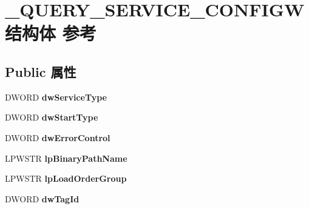 \hypertarget{struct___q_u_e_r_y___s_e_r_v_i_c_e___c_o_n_f_i_g_w}{}\section{\+\_\+\+Q\+U\+E\+R\+Y\+\_\+\+S\+E\+R\+V\+I\+C\+E\+\_\+\+C\+O\+N\+F\+I\+G\+W结构体 参考}
\label{struct___q_u_e_r_y___s_e_r_v_i_c_e___c_o_n_f_i_g_w}
\subsection*{Public 属性}
\begin{DoxyCompactItemize}
\item 
\mbox{\label{struct___q_u_e_r_y___s_e_r_v_i_c_e___c_o_n_f_i_g_w_aba726da6a95cd58130d304f642ab639e}} 
D\+W\+O\+RD {\bfseries dw\+Service\+Type}
\item 
\mbox{\label{struct___q_u_e_r_y___s_e_r_v_i_c_e___c_o_n_f_i_g_w_a27a985ab85babb808aef76313a398639}} 
D\+W\+O\+RD {\bfseries dw\+Start\+Type}
\item 
\mbox{\label{struct___q_u_e_r_y___s_e_r_v_i_c_e___c_o_n_f_i_g_w_ae67cb722fb49ee1a3caa0a62fdc8b52b}} 
D\+W\+O\+RD {\bfseries dw\+Error\+Control}
\item 
\mbox{\label{struct___q_u_e_r_y___s_e_r_v_i_c_e___c_o_n_f_i_g_w_aa92cd001a9661696ef20b2bc1463d271}} 
L\+P\+W\+S\+TR {\bfseries lp\+Binary\+Path\+Name}
\item 
\mbox{\label{struct___q_u_e_r_y___s_e_r_v_i_c_e___c_o_n_f_i_g_w_ac5014023f41a62b7e5c89a6c3f42227d}} 
L\+P\+W\+S\+TR {\bfseries lp\+Load\+Order\+Group}
\item 
\mbox{\label{struct___q_u_e_r_y___s_e_r_v_i_c_e___c_o_n_f_i_g_w_a3aa5bd9f8715b46b29a2db9113d6a5b6}} 
D\+W\+O\+RD {\bfseries dw\+Tag\+Id}
\item 
\mbox{\label{struct___q_u_e_r_y___s_e_r_v_i_c_e___c_o_n_f_i_g_w_a832e5fd15150dca974b982ebe58e0a6f}} 

\end{DoxyCompactItemize}
